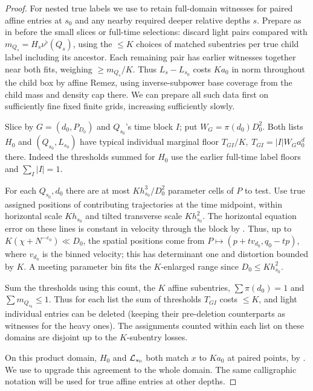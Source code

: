 \begin{proof}
For nested true labels we use  to retain full-domain witnesses for paired affine entries at \(s_0\) and any nearby required deeper relative depths \(s\). Prepare as in  before the small slices or full-time selections: discard light pairs compared with \(m_{Q_s}=H_s\nu^\flat(Q_s)\), using the \(\le K\) choices of matched subentries per true child label including its ancestor. Each remaining pair has earlier witnesses together near both fits, weighing \(\ge m_{Q_s}/K\). Thus \(L_s-L_{s_0}\) costs \(K a_0\) in norm throughout the child box by affine Remez, using inverse-subpower base coverage from the child mass and density cap there. We can prepare all such data first on sufficiently fine fixed finite grids, increasing sufficiently slowly.

Slice by \(G=(d_0,P_{D_0})\) and \(Q_{s_0}\)'s time block \(I\);
put \(W_G=\pi(d_0)D_0^2\). Both lists \(H_0\) and
\((Q_{s_0},L_{s_0})\) have typical individual marginal floor
\(T_{GI}/K,\ T_{GI}=|I|W_G a_0^d\) there. Indeed the thresholds
summed for \(H_0\) use the earlier full-time label floors and
\(\sum_I|I|=1\).

For each \(Q_{s_0},d_0\) there are at most
\(K h_{s_0}^3/D_0^2\) parameter cells of \(P\) to test. Use true
assigned positions of contributing trajectories at the time midpoint,
within horizontal scale \(K h_{s_0}\) and tilted transverse scale
\(K h_{s_0}^2\). The horizontal equation error on these lines is
constant in velocity through the block by
. Thus, up to
\(K(\chi+N^{-e_0})\ll D_0\), the spatial positions come from
\(P\mapsto(p+t v_{d_0},q_0-tp)\), where \(v_{d_0}\) is the binned
velocity; this has determinant one and distortion bounded by \(K\).
A meeting parameter bin fits the \(K\)-enlarged range since
\(D_0\le K h_{s_0}^2\).

Sum the thresholds using this count, the \(K\) affine subentries,
\(\sum\pi(d_0)=1\) and \(\sum m_{Q_{s_0}}\le1\). Thus for each
list the sum of thresholds \(T_{GI}\) costs \(\le K\), and light
individual entries can be deleted (keeping their pre-deletion
counterparts as witnesses for the heavy ones). The assignments counted
within each list on these domains are disjoint up to the
\(K\)-subentry losses.

On this product domain, \(H_0\) and \({\cal L}_{s_0}\) both
match \(x\) to \(Ka_0\) at paired points, by
. We use
 to upgrade this agreement to the
whole domain. The same calligraphic notation will be used for
true affine entries at other depths.


\end{proof}
